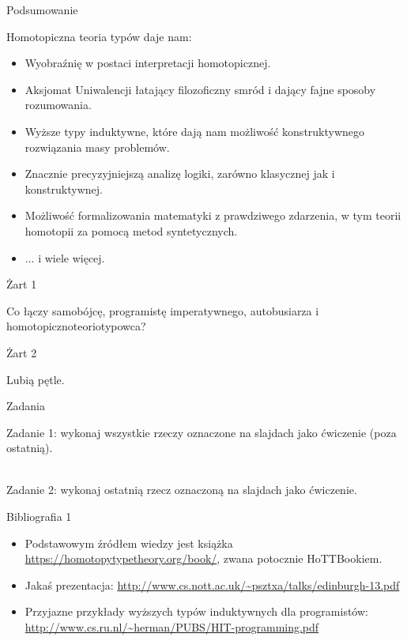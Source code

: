 \documentclass{beamer}
\begin{document}
\begin{frame}{Podsumowanie}

Homotopiczna teoria typów daje nam:
\begin{itemize}
	\item Wyobraźnię w postaci interpretacji homotopicznej.
	\item Aksjomat Uniwalencji łatający filozoficzny smród i dający fajne sposoby rozumowania.
	\item Wyższe typy induktywne, które dają nam możliwość konstruktywnego rozwiązania masy problemów.
	\item Znacznie precyzyjniejszą analizę logiki, zarówno klasycznej jak i konstruktywnej.
	\item Możliwość formalizowania matematyki z prawdziwego zdarzenia, w tym teorii homotopii za pomocą metod syntetycznych.
	\item ... i wiele więcej.
\end{itemize}

\end{frame}

\begin{frame}{Żart 1}

Co łączy samobójcę, programistę imperatywnego, autobusiarza i homotopicznoteoriotypowca?

\end{frame}

\begin{frame}{Żart 2}

Lubią pętle.

\end{frame}

\begin{frame}{Zadania}

Zadanie 1: wykonaj wszystkie rzeczy oznaczone na slajdach jako ćwiczenie (poza ostatnią). \\~\

Zadanie 2: wykonaj ostatnią rzecz oznaczoną na slajdach jako ćwiczenie.

\end{frame}

\begin{frame}{Bibliografia 1}
\begin{itemize}
	\item Podstawowym źródłem wiedzy jest książka \url{https://homotopytypetheory.org/book/}, zwana potocznie HoTTBookiem.
	\item Jakaś prezentacja: \url{http://www.cs.nott.ac.uk/~psztxa/talks/edinburgh-13.pdf}
	\item Przyjazne przykłady wyższych typów induktywnych dla programistów: \url{http://www.cs.ru.nl/~herman/PUBS/HIT-programming.pdf}
\end{itemize}
\end{frame}
\end{document}
